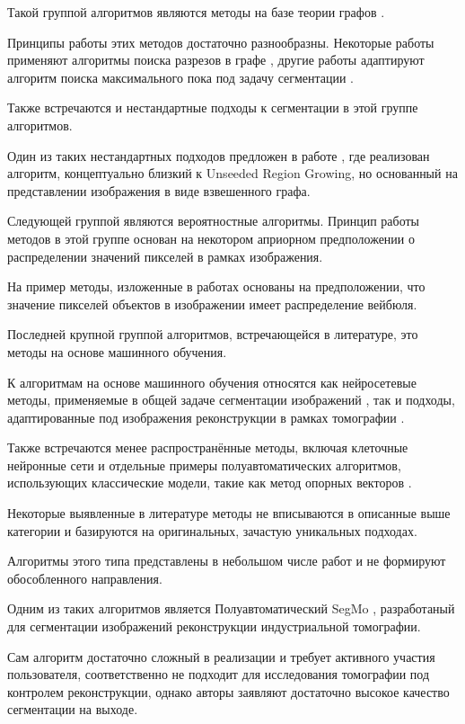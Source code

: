 Такой группой алгоритмов являются методы на базе теории графов \cite{camilus2012review}. 

Принципы работы этих методов достаточно разнообразны. Некоторые работы применяют алгоритмы поиска разрезов в графе \cite{boykov2003computing, peng2019interactive}, другие работы адаптируют алгоритм поиска максимального пока под задачу сегментации \cite{zeng2008topology}.

Также встречаются и нестандартные подходы к сегментации в этой группе алгоритмов.

Один из таких нестандартных подходов предложен в работе \cite{felzenszwalb2004efficient}, где реализован алгоритм, концептуально близкий к Unseeded Region Growing, но основанный на представлении изображения в виде взвешенного графа.

Следующей группой являются вероятностные алгоритмы. Принцип работы методов в этой группе основан на некотором априорном предположении о распределении значений пикселей в рамках изображения.

На пример методы, изложенные в работах \cite{hu2003volumetric, ayed2006unsupervised} основаны на предположении, что значение пикселей объектов в  изображении имеет распределение вейбюля.

Последней крупной группой алгоритмов, встречающейся в литературе, это методы на основе машинного обучения.

К алгоритмам на основе машинного обучения относятся как нейросетевые методы, применяемые в общей задаче сегментации изображений \cite{lu20193d, ха2016свёрточная}, так и подходы, адаптированные под изображения реконструкции в рамках томографии \cite{milletari2016v}. 

Также встречаются менее распространённые методы, включая клеточные нейронные сети \cite{liu2011industrial} и отдельные примеры полуавтоматических алгоритмов, использующих классические модели, такие как метод опорных векторов \cite{lang2022ai, gonella2019semi}.

Некоторые выявленные в литературе методы не вписываются в описанные выше категории и базируются на оригинальных, зачастую уникальных подходах. 

Алгоритмы этого типа представлены в небольшом числе работ и не формируют обособленного направления.

Одним из таких алгоритмов является Полуавтоматический SegMo \cite{nagai2019segmo}, разработаный для сегментации изображений реконструкции индустриальной томографии.

Сам алгоритм достаточно сложный в реализации и требует активного участия пользователя, соответственно не подходит для исследования томографии под контролем реконструкции, однако авторы заявляют достаточно высокое качество сегментации на выходе.

